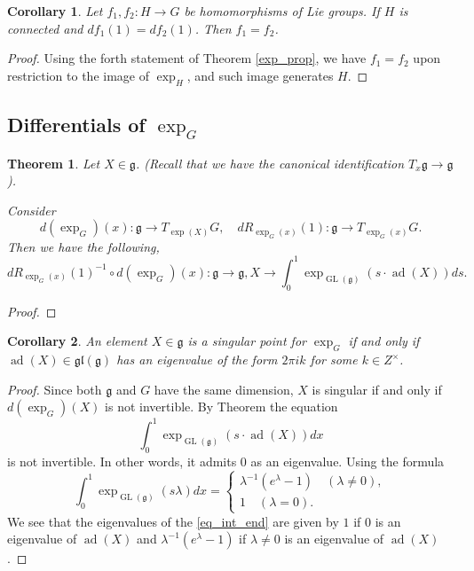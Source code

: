 \documentclass{article}
\newtheorem{theorem}{Theorem}[section]
\newtheorem{corollary}{Corollary}[section]
\numberwithin{equation}{section}
\DeclareMathOperator{\ad}{ad}
\DeclareMathOperator{\GL}{GL}
\begin{document}
\begin{corollary}
Let $f_1,f_2:H\to G$ be homomorphisms of Lie groups. If $H$ is connected and $df_1(1)=df_2(1)$. Then $f_1=f_2$.
\end{corollary}

\begin{proof}
Using the forth statement of Theorem \ref{exp_prop}, we have $f_1=f_2$ upon restriction to the image of $\exp_H$, and such image generates $H$. 
\end{proof}

\subsection{Differentials of $\exp_G$}

\begin{theorem}
Let $X\in\mathfrak{g}$. (Recall that we have the canonical identification $T_x\mathfrak{g}\to\mathfrak{g}$).\\
\par Consider 
\begin{equation*}
d(\exp_G)(x):\mathfrak{g}\to T_{\exp(X)}G,\quad dR_{\exp_G(x)}(1):\mathfrak{g}\to T_{\exp_G(x)}G.
\end{equation*}
Then we have the following,
\begin{equation*}
dR_{\exp_G(x)}(1)^{-1}\circ d(\exp_G)(x):\mathfrak{g}\to\mathfrak{g}, X\to\int_0^1\exp_{\GL(\mathfrak{g})}(s\cdot\ad(X))ds.
\end{equation*} 
\label{g_end_int}
\end{theorem}

\begin{proof}
\end{proof}

\begin{corollary}
An element $X\in\mathfrak{g}$ is a singular point for $\exp_G$ if and only if $\ad(X)\in\mathfrak{gl}(\mathfrak{g})$ has an eigenvalue of the form $2\pi ik$ for some $k\in Z^{\times}$. 
\label{sing_lie_alg}
\end{corollary}

\begin{proof}
Since both $\mathfrak{g}$ and $G$ have the same dimension, $X$ is singular if and only if $d(\exp_G)(X)$ is not invertible. By Theorem %
the equation
\begin{equation}
\int_0^1\exp_{\GL(\mathfrak{g})}(s\cdot\ad(X))dx
\label{eq_int_end}
\end{equation}
is not invertible. In other words, it admits $0$ as an eigenvalue. Using the formula
\begin{equation*}
\int_0^1\exp_{\GL(\mathfrak{g})}(s\lambda)dx = 
\begin{cases}
\lambda^{-1}(e^{\lambda}-1)\quad(\lambda\not=0),\\
1\quad(\lambda=0).
\end{cases}
\end{equation*}
We see that the eigenvalues of the \eqref{eq_int_end} are given by $1$ if $0$ is an eigenvalue of $\ad(X)$ and $\lambda^{-1}(e^\lambda-1)$ if $\lambda\not=0$ is an eigenvalue of $\ad(X)$.
\end{proof}
\end{document}

